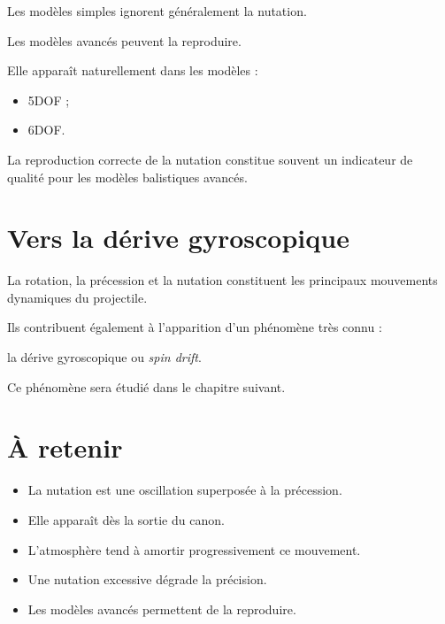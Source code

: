 Les modèles simples ignorent généralement la nutation.

Les modèles avancés peuvent la reproduire.

Elle apparaît naturellement dans les modèles :

\begin{itemize}
    \item 5DOF ;
    \item 6DOF.
\end{itemize}

\begin{simulation}

La reproduction correcte de la nutation constitue souvent un indicateur de
qualité pour les modèles balistiques avancés.

\end{simulation}

\section{Vers la dérive gyroscopique}

La rotation, la précession et la nutation constituent les principaux
mouvements dynamiques du projectile.

Ils contribuent également à l'apparition d'un phénomène très connu :

la dérive gyroscopique ou \emph{spin drift}.

Ce phénomène sera étudié dans le chapitre suivant.

\section{À retenir}

\begin{aretenir}

\begin{itemize}
    \item La nutation est une oscillation superposée à la précession.
    \item Elle apparaît dès la sortie du canon.
    \item L'atmosphère tend à amortir progressivement ce mouvement.
    \item Une nutation excessive dégrade la précision.
    \item Les modèles avancés permettent de la reproduire.
\end{itemize}

\end{aretenir}
